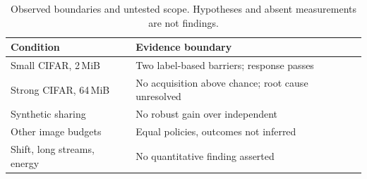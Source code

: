 \begin{table}[t]
\caption{Observed boundaries and untested scope. Hypotheses and absent measurements are not findings.}
\label{tab:limits}\centering\small
\begin{tabularx}{\linewidth}{YY}\toprule
Condition & Evidence boundary\\\midrule
Small CIFAR, 2\,MiB & Two label-based barriers; response passes\\
Strong CIFAR, 64\,MiB & No acquisition above chance; root cause unresolved\\
Synthetic sharing & No robust gain over independent\\
Other image budgets & Equal policies, outcomes not inferred\\
Shift, long streams, energy & No quantitative finding asserted\\
\bottomrule\end{tabularx}\end{table}

